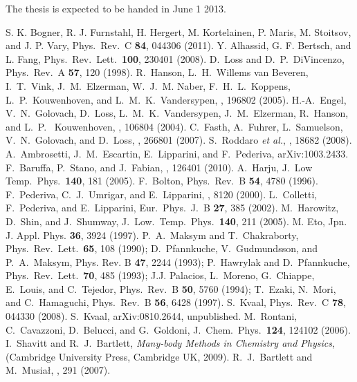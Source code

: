 \documentclass[twocolumn]{revtex4}
\begin{document}
The thesis is expected to be handed in June 1 2013.


\begin{thebibliography}{200}
 S. K. Bogner, R. J. Furnstahl, H. Hergert, M. Kortelainen, P. Maris, M. Stoitsov, and J. P. Vary, Phys.~Rev.~C {\bf 84}, 044306 (2011).
 Y. Alhassid, G. F. Bertsch, and L. Fang, Phys.~Rev.~Lett.~{\bf 100}, 230401 (2008).
 D.~Loss and D.~P.~DiVincenzo, Phys.~Rev.~A {\bf 57}, 120 (1998).
 R.~Hanson, L.~H.~Willems van Beveren, I.~T.~Vink, J.~M.~Elzerman, W.~J.~M. Naber, F.~H.~L.~Koppens, L.~P.~Kouwenhoven, and L.~M.~K.~Vandersypen, , 196802 (2005).
 H.-A.~Engel, V.~N.~Golovach, D.~Loss, L.~M.~K.~Vandersypen, J.~M.~Elzerman, R.~Hanson, and L.~P.~ Kouwenhoven, , 106804 (2004). 
 C.~Fasth, A.~Fuhrer, L.~Samuelson, V.~N.~Golovach, and D.~Loss, , 266801 (2007).
 S.~Roddaro {\em et al.}, , 18682 (2008).
A.~Ambrosetti, J.~M.~Escartin, E.~Lipparini, and F.~Pederiva, arXiv:1003.2433.
 F.~Baruffa, P.~Stano, and J.~Fabian, , 126401 (2010).
 A.~Harju, J.~Low Temp.~Phys.~{\bf 140}, 181 (2005).
 F.~Bolton, Phys.~Rev.~B {\bf 54}, 4780 (1996).
F.~Pederiva, C.~J.~Umrigar, and E.~Lipparini, , 8120 (2000).
L.~Colletti, F.~Pederiva, and  E.~Lipparini,  Eur.~Phys.~J.~B {\bf 27}, 
385 (2002).
 M.~Harowitz, D.~Shin, and J.~Shumway, J.~Low.~Temp.~Phys.~{\bf 140}, 211 (2005).
 M. Eto, Jpn. J. Appl. Phys. {\bf 36}, 3924 (1997).
 P.~A.~Maksym and T.~Chakraborty, Phys.~Rev.~Lett.~{\bf 65}, 108 (1990);
D.~Pfannkuche, V.~Gudmundsson, and P.~A.~Maksym, Phys. Rev. B {\bf 47}, 2244 (1993);
P.~Hawrylak and D.~Pfannkuche, Phys.~Rev.~Lett.~{\bf 70}, 485 (1993); J.J. Palacios,
L.~Moreno, G.~Chiappe, E.~Louis, and C.~Tejedor, Phys.~Rev.~B {\bf 50}, 5760 (1994);
T.~Ezaki, N.~Mori, and C.~Hamaguchi, Phys.~Rev.~B {\bf 56}, 6428 (1997).
 S.~Kvaal, Phys.~Rev.~C {\bf 78}, 044330 (2008).
 S.~Kvaal, arXiv:0810.2644, unpublished.
 M.~Rontani, C.~Cavazzoni, 
D.~Belucci, and G.~Goldoni, J.~Chem.~Phys.~{\bf 124}, 124102 (2006).
 I.~Shavitt and R.\ J.\ Bartlett, {\em Many-body Methods in Chemistry and Physics},  
(Cambridge University Press, Cambridge UK, 2009). 
 R.\ J.\ Bartlett and M.\ Musia{\l}, , 291 (2007).

\end{thebibliography}
\end{document}
